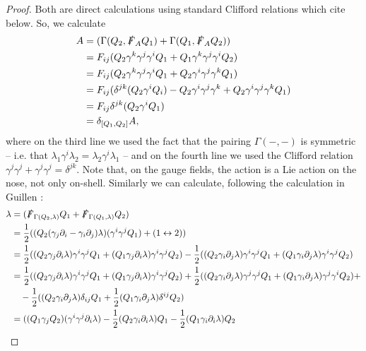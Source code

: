 \documentclass[10pt, oneside]{article}
\begin{document}
\begin{proof}
Both are direct calculations using standard Clifford relations which cite below.
So, we calculate
\begin{align*}
[\delta_{Q_1}, \delta_{Q_2}] A &= (\Gamma(Q_2,\sd F_A Q_1) + \Gamma(Q_1,\sd F_A Q_2)) \\
&=  F_{ij}(Q_2 \gamma^k \gamma^j \gamma^i Q_1 + Q_1 \gamma^k \gamma^j \gamma^i Q_2) \\
&=  F_{ij}(Q_2 \gamma^k \gamma^j \gamma^i Q_1 + Q_2 \gamma^i \gamma^j \gamma^k Q_1)\\
&= F_{ij}(\delta^{jk}(Q_2\gamma^i Q_i) - Q_2 \gamma^i \gamma^j \gamma^k + Q_2 \gamma^i \gamma^j \gamma^k Q_1)\\
&=  F_{ij}\delta^{jk}(Q_2 \gamma^i Q_1) \\
&= \delta_{[Q_1, Q_2]} A,
\end{align*}
where on the third line we used the fact that the pairing $\Gamma(-,-)$ is symmetric -- i.e. that $\lambda_1 \gamma^i \lambda_2 = \lambda_2 \gamma^i \lambda_1$ -- and on the fourth line we used the Clifford relation $\gamma^j\gamma^j+\gamma^j\gamma^j = \delta^{jk}$.  Note that, on the gauge fields, the action is a Lie action on the nose, not only on-shell.  Similarly we can calculate, following the calculation in Guillen \cite{Guillen}:
\begin{align*}
[\delta_{Q_1}, \delta_{Q_2}] \lambda &= (\sd F_{\Gamma(Q_2, \lambda)} Q_1 + \sd F_{\Gamma(Q_1,\lambda)} Q_2) \\
&= \frac 12((Q_2 (\gamma_j \dd_i - \gamma_i \dd_j) \lambda) (\gamma^i \gamma^j Q_1) + (1 \leftrightarrow 2)) \\
&= \frac 12((Q_2 \gamma_j \dd_i \lambda) \gamma^i \gamma^j Q_1 + (Q_1 \gamma_j \dd_i \lambda) \gamma^i \gamma^j Q_2) - \frac 12((Q_2 \gamma_i \dd_j \lambda) \gamma^i \gamma^j Q_1 + (Q_1 \gamma_i \dd_j \lambda) \gamma^i \gamma^j Q_2) \\
&= \frac 12((Q_2 \gamma_j \dd_i \lambda) \gamma^i \gamma^j Q_1 + (Q_1 \gamma_j \dd_i \lambda) \gamma^i \gamma^j Q_2) + \frac 12((Q_2 \gamma_i \dd_j \lambda) \gamma^j \gamma^j Q_1 + (Q_1 \gamma_i \dd_j \lambda) \gamma^j \gamma^i Q_2) + \\
&\quad - \frac 12((Q_2 \gamma_i \dd_j \lambda) \delta_{ij} Q_1 + \frac 12(Q_1 \gamma_i \dd_j \lambda) \delta^{ij} Q_2) \\
&= ((Q_1 \gamma_j Q_2) (\gamma^i \gamma^j \dd_i \lambda) - \frac 12(Q_2 \gamma_i \dd_i \lambda)Q_1 - \frac 12(Q_1 \gamma_i \dd_i \lambda)Q_2
\end{align*}

\end{proof}
\end{document}
